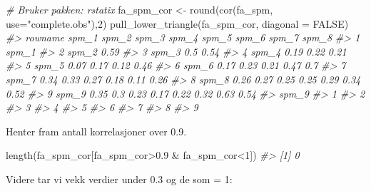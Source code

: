 \documentclass[
]{article}
\newenvironment{Shaded}{\begin{snugshade}}{\end{snugshade}}
\newcommand{\AttributeTok}[1]{\textcolor[rgb]{0.77,0.63,0.00}{#1}}
\newcommand{\CommentTok}[1]{\textcolor[rgb]{0.56,0.35,0.01}{\textit{#1}}}
\newcommand{\ConstantTok}[1]{\textcolor[rgb]{0.00,0.00,0.00}{#1}}
\newcommand{\DecValTok}[1]{\textcolor[rgb]{0.00,0.00,0.81}{#1}}
\newcommand{\FloatTok}[1]{\textcolor[rgb]{0.00,0.00,0.81}{#1}}
\newcommand{\FunctionTok}[1]{\textcolor[rgb]{0.00,0.00,0.00}{#1}}
\newcommand{\NormalTok}[1]{#1}
\newcommand{\OtherTok}[1]{\textcolor[rgb]{0.56,0.35,0.01}{#1}}
\newcommand{\SpecialCharTok}[1]{\textcolor[rgb]{0.00,0.00,0.00}{#1}}
\newcommand{\StringTok}[1]{\textcolor[rgb]{0.31,0.60,0.02}{#1}}
\begin{document}
\begin{Shaded}
\begin{Highlighting}[]
\CommentTok{\# Bruker pakken: rstatix}
\NormalTok{fa\_spm\_cor }\OtherTok{\textless{}{-}} \FunctionTok{round}\NormalTok{(}\FunctionTok{cor}\NormalTok{(fa\_spm, }\AttributeTok{use=}\StringTok{"complete.obs"}\NormalTok{),}\DecValTok{2}\NormalTok{)}
\FunctionTok{pull\_lower\_triangle}\NormalTok{(fa\_spm\_cor, }\AttributeTok{diagonal =} \ConstantTok{FALSE}\NormalTok{)}
\CommentTok{\#\textgreater{}   rowname spm\_1 spm\_2 spm\_3 spm\_4 spm\_5 spm\_6 spm\_7 spm\_8}
\CommentTok{\#\textgreater{} 1   spm\_1                                                }
\CommentTok{\#\textgreater{} 2   spm\_2  0.59                                          }
\CommentTok{\#\textgreater{} 3   spm\_3   0.5  0.54                                    }
\CommentTok{\#\textgreater{} 4   spm\_4  0.19  0.22  0.21                              }
\CommentTok{\#\textgreater{} 5   spm\_5  0.07  0.17  0.12  0.46                        }
\CommentTok{\#\textgreater{} 6   spm\_6  0.17  0.23  0.21  0.47   0.7                  }
\CommentTok{\#\textgreater{} 7   spm\_7  0.34  0.33  0.27  0.18  0.11  0.26            }
\CommentTok{\#\textgreater{} 8   spm\_8  0.26  0.27  0.25  0.25  0.29  0.34  0.52      }
\CommentTok{\#\textgreater{} 9   spm\_9  0.35   0.3  0.23  0.17  0.22  0.32  0.63  0.54}
\CommentTok{\#\textgreater{}   spm\_9}
\CommentTok{\#\textgreater{} 1      }
\CommentTok{\#\textgreater{} 2      }
\CommentTok{\#\textgreater{} 3      }
\CommentTok{\#\textgreater{} 4      }
\CommentTok{\#\textgreater{} 5      }
\CommentTok{\#\textgreater{} 6      }
\CommentTok{\#\textgreater{} 7      }
\CommentTok{\#\textgreater{} 8      }
\CommentTok{\#\textgreater{} 9}
\end{Highlighting}
\end{Shaded}

Henter fram antall korrelasjoner over 0.9.

\begin{Shaded}
\begin{Highlighting}[]
\FunctionTok{length}\NormalTok{(fa\_spm\_cor[fa\_spm\_cor}\SpecialCharTok{\textgreater{}}\FloatTok{0.9} \SpecialCharTok{\&}\NormalTok{ fa\_spm\_cor}\SpecialCharTok{\textless{}}\DecValTok{1}\NormalTok{])}
\CommentTok{\#\textgreater{} [1] 0}
\end{Highlighting}
\end{Shaded}

Videre tar vi vekk verdier under 0.3 og de som = 1:
\end{document}
